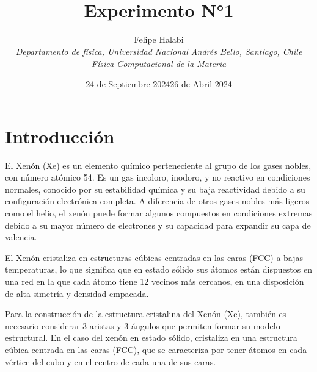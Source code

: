 \documentclass[10pt,letterpaper,twocolumn]{article}
\title{\noindent\\[-4cm]\bfseries Experimento N°1}
\author{Felipe Halabi
\\\small\itshape \textit{Departamento de física, Universidad Nacional Andrés Bello, Santiago, Chile}
\\\small\itshape Física Computacional de la Materia}
\date{24 de Septiembre 2024}
\date{26 de Abril 2024}
\begin{document}
\renewcommand{\tablename}{Tabla}
\section*{Introducción}
El Xenón (Xe) es un elemento químico perteneciente al grupo de los gases nobles, con número atómico 54. Es un gas incoloro, inodoro, y no reactivo en condiciones normales, conocido por su estabilidad química y su baja reactividad debido a su configuración electrónica completa. A diferencia de otros gases nobles más ligeros como el helio, el xenón puede formar algunos compuestos en condiciones extremas debido a su mayor número de electrones y su capacidad para expandir su capa de valencia.

El Xenón cristaliza en estructuras cúbicas centradas en las caras (FCC) a bajas temperaturas, lo que significa que en estado sólido sus átomos están dispuestos en una red en la que cada átomo tiene 12 vecinos más cercanos, en una disposición de alta simetría y densidad empacada.


Para la construcción de la estructura cristalina del Xenón (Xe), también es necesario considerar 3 aristas y 3 ángulos que permiten formar su modelo estructural. En el caso del xenón en estado sólido, cristaliza en una estructura cúbica centrada en las caras (FCC), que se caracteriza por tener átomos en cada vértice del cubo y en el centro de cada una de sus caras.
\end{document}
